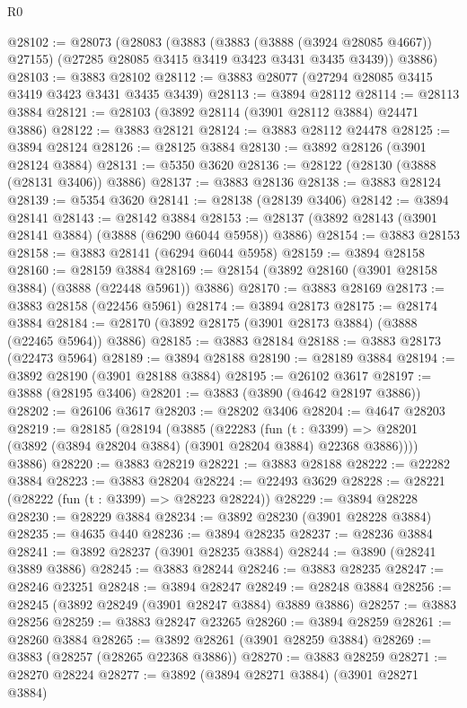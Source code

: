 \begin{lexlean}{R0}
\begin{coremodule}
@28102 := @28073
    (@28083
      (@3883
        (@3883 (@3888 (@3924 @28085 @4667)) @27155)
        (@27285 @28085 @3415 @3419 @3423 @3431 @3435 @3439))
      @3886)
@28103 := @3883 @28102
@28112 := @3883 @28077 (@27294 @28085 @3415 @3419 @3423 @3431 @3435 @3439)
@28113 := @3894 @28112
@28114 := @28113 @3884
@28121 := @28103 (@3892 @28114 (@3901 @28112 @3884) @24471 @3886)
@28122 := @3883 @28121
@28124 := @3883 @28112 @24478
@28125 := @3894 @28124
@28126 := @28125 @3884
@28130 := @3892 @28126 (@3901 @28124 @3884)
@28131 := @5350 @3620
@28136 := @28122 (@28130 (@3888 (@28131 @3406)) @3886)
@28137 := @3883 @28136
@28138 := @3883 @28124
@28139 := @5354 @3620
@28141 := @28138 (@28139 @3406)
@28142 := @3894 @28141
@28143 := @28142 @3884
@28153 := @28137 (@3892 @28143 (@3901 @28141 @3884) (@3888 (@6290 @6044 @5958)) @3886)
@28154 := @3883 @28153
@28158 := @3883 @28141 (@6294 @6044 @5958)
@28159 := @3894 @28158
@28160 := @28159 @3884
@28169 := @28154 (@3892 @28160 (@3901 @28158 @3884) (@3888 (@22448 @5961)) @3886)
@28170 := @3883 @28169
@28173 := @3883 @28158 (@22456 @5961)
@28174 := @3894 @28173
@28175 := @28174 @3884
@28184 := @28170 (@3892 @28175 (@3901 @28173 @3884) (@3888 (@22465 @5964)) @3886)
@28185 := @3883 @28184
@28188 := @3883 @28173 (@22473 @5964)
@28189 := @3894 @28188
@28190 := @28189 @3884
@28194 := @3892 @28190 (@3901 @28188 @3884)
@28195 := @26102 @3617
@28197 := @3888 (@28195 @3406)
@28201 := @3883 (@3890 (@4642 @28197 @3886))
@28202 := @26106 @3617
@28203 := @28202 @3406
@28204 := @4647 @28203
@28219 := @28185
    (@28194
      (@3885
        (@22283
          (fun (t : @3399) =>
          @28201 (@3892 (@3894 @28204 @3884) (@3901 @28204 @3884) @22368 @3886))))
      @3886)
@28220 := @3883 @28219
@28221 := @3883 @28188
@28222 := @22282 @3884
@28223 := @3883 @28204
@28224 := @22493 @3629
@28228 := @28221 (@28222 (fun (t : @3399) => @28223 @28224))
@28229 := @3894 @28228
@28230 := @28229 @3884
@28234 := @3892 @28230 (@3901 @28228 @3884)
@28235 := @4635 @440
@28236 := @3894 @28235
@28237 := @28236 @3884
@28241 := @3892 @28237 (@3901 @28235 @3884)
@28244 := @3890 (@28241 @3889 @3886)
@28245 := @3883 @28244
@28246 := @3883 @28235
@28247 := @28246 @23251
@28248 := @3894 @28247
@28249 := @28248 @3884
@28256 := @28245 (@3892 @28249 (@3901 @28247 @3884) @3889 @3886)
@28257 := @3883 @28256
@28259 := @3883 @28247 @23265
@28260 := @3894 @28259
@28261 := @28260 @3884
@28265 := @3892 @28261 (@3901 @28259 @3884)
@28269 := @3883 (@28257 (@28265 @22368 @3886))
@28270 := @3883 @28259
@28271 := @28270 @28224
@28277 := @3892 (@3894 @28271 @3884) (@3901 @28271 @3884)

\end{coremodule}
\end{lexlean}
